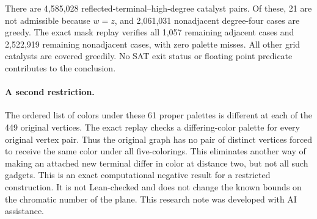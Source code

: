 \documentclass[10pt,letterpaper]{article}
\begin{document}
There are 4,585,028 reflected-terminal--high-degree
catalyst pairs. Of these, 21 are not admissible because
\(w=z\), and 2,061,031 nonadjacent degree-four cases are
greedy. The exact mask replay verifies all 1,057 remaining
adjacent cases and 2,522,919 remaining nonadjacent cases,
with zero palette misses. All other grid catalysts are
covered greedily. No SAT exit status or floating point
predicate contributes to the conclusion.


\paragraph{A second restriction.}
The ordered list of colors under these 61 proper palettes is
different at each of the 449 original vertices. The exact replay
checks a differing-color palette for every original vertex pair.
Thus the original graph has no pair of distinct vertices forced to
receive the same color under all five-colorings. This eliminates
another way of making an attached new terminal differ in color at
distance two, but not all such gadgets.
\medskip\noindent
This is an exact computational negative result for a restricted
construction. It is not Lean-checked and does not change
the known bounds on the chromatic number of the plane.
This research note was developed with AI assistance.
\end{document}
